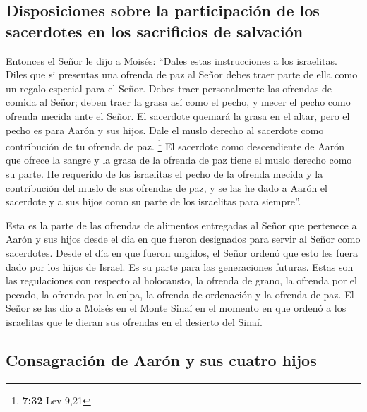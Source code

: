 \hypertarget{disposiciones-sobre-la-participaciuxf3n-de-los-sacerdotes-en-los-sacrificios-de-salvaciuxf3n}{%
\subsection{Disposiciones sobre la participación de los sacerdotes en
los sacrificios de
salvación}\label{disposiciones-sobre-la-participaciuxf3n-de-los-sacerdotes-en-los-sacrificios-de-salvaciuxf3n}}

 Entonces el Señor le dijo a Moisés: 
``Dales estas instrucciones a los israelitas. Diles que si presentas una
ofrenda de paz al Señor debes traer parte de ella como un regalo
especial para el Señor.  Debes traer personalmente las
ofrendas de comida al Señor; deben traer la grasa así como el pecho, y
mecer el pecho como ofrenda mecida ante el Señor.  El
sacerdote quemará la grasa en el altar, pero el pecho es para Aarón y
sus hijos.  Dale el muslo derecho al sacerdote como
contribución de tu ofrenda de paz. \footnote{\textbf{7:32} Lev 9,21}
 El sacerdote como descendiente de Aarón que ofrece la
sangre y la grasa de la ofrenda de paz tiene el muslo derecho como su
parte.  He requerido de los israelitas el pecho de la
ofrenda mecida y la contribución del muslo de sus ofrendas de paz, y se
las he dado a Aarón el sacerdote y a sus hijos como su parte de los
israelitas para siempre''.

 Esta es la parte de las ofrendas de alimentos entregadas
al Señor que pertenece a Aarón y sus hijos desde el día en que fueron
designados para servir al Señor como sacerdotes.  Desde
el día en que fueron ungidos, el Señor ordenó que esto les fuera dado
por los hijos de Israel. Es su parte para las generaciones futuras.
 Estas son las regulaciones con respecto al holocausto,
la ofrenda de grano, la ofrenda por el pecado, la ofrenda por la culpa,
la ofrenda de ordenación y la ofrenda de paz.  El Señor
se las dio a Moisés en el Monte Sinaí en el momento en que ordenó a los
israelitas que le dieran sus ofrendas en el desierto del Sinaí.

\hypertarget{consagraciuxf3n-de-aaruxf3n-y-sus-cuatro-hijos}{%
\subsection{Consagración de Aarón y sus cuatro
hijos}\label{consagraciuxf3n-de-aaruxf3n-y-sus-cuatro-hijos}}

